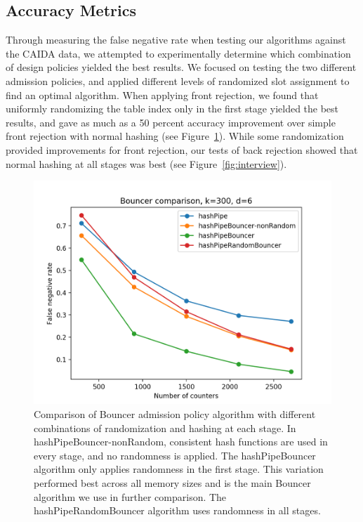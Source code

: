 \subsection{Accuracy Metrics}
Through measuring the false negative rate when testing our algorithms against the CAIDA data, we attempted to experimentally determine which combination of design policies yielded the best results. We focused on testing the two different admission policies, and applied different levels of randomized slot assignment to find an optimal algorithm. When applying front rejection, we found that uniformly randomizing the table index only in the first stage yielded the best results, and gave as much as a 50 percent accuracy improvement over simple front rejection with normal hashing (see Figure~\ref{fig:bouncer}). While some randomization provided improvements for front rejection, our tests of back rejection showed that normal hashing at all stages was best (see Figure~\ref{fig:interview}).
\begin{figure}[!htb]
  \centering
    \includegraphics[scale=0.5]{bouncer}
     \caption{Comparison of Bouncer admission policy algorithm with different combinations of randomization and hashing at each stage. In hashPipeBouncer-nonRandom, consistent hash functions are used in every stage, and no randomness is applied. The hashPipeBouncer algorithm only applies randomness in the first stage. This variation performed best across all memory sizes and is the main Bouncer algorithm we use in further comparison. The hashPipeRandomBouncer algorithm uses randomness in all stages.}
     \label{fig:bouncer}
\end{figure}
